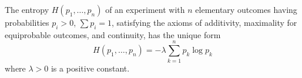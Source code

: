 The entropy $H(p_1, \ldots, p_n)$ of an experiment with $n$ elementary outcomes having probabilities $p_i > 0$, $\sum p_i = 1$, satisfying the axioms of additivity, maximality for equiprobable outcomes, and continuity, has the unique form
$$H(p_1, \ldots, p_n) = -\lambda \sum_{k=1}^{n} p_k \log p_k$$
where $\lambda > 0$ is a positive constant.
